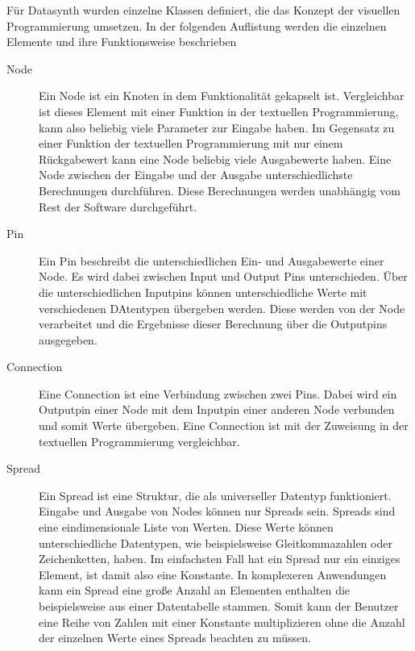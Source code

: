 \documentclass[a4paper, 12pt, DIVcalc, onepage, pdftex, headsepline, footsepline]{scrreprt}
\begin{document}
Für Datasynth wurden einzelne Klassen definiert, die das Konzept der visuellen
Programmierung umsetzen. In der folgenden Auflistung werden die einzelnen
Elemente und ihre Funktionsweise beschrieben
\begin{description}
\item[Node]
Ein Node ist ein Knoten in dem Funktionalität gekapselt ist. Vergleichbar ist dieses
Element mit einer Funktion in der textuellen Programmierung, kann also
beliebig viele Parameter zur Eingabe haben. Im Gegensatz zu einer Funktion der textuellen
Programmierung mit nur einem Rückgabewert kann eine Node beliebig viele Ausgabewerte haben.
Eine Node zwischen der Eingabe und der Ausgabe unterschiedlichste Berechnungen durchführen.
Diese Berechnungen werden unabhängig vom Rest der Software durchgeführt.
\item[Pin]
Ein Pin beschreibt die unterschiedlichen Ein- und Ausgabewerte einer Node.
Es wird dabei zwischen Input und Output Pins unterschieden. Über die unterschiedlichen
Inputpins können unterschiedliche Werte mit verschiedenen DAtentypen übergeben werden.
Diese werden von der Node verarbeitet und die Ergebnisse dieser Berechnung
über die Outputpins ausgegeben.
\item[Connection]
Eine Connection ist eine Verbindung zwischen zwei Pins. Dabei wird ein Outputpin einer
Node mit dem Inputpin einer anderen Node verbunden und somit Werte übergeben. Eine Connection
ist mit der Zuweisung in der textuellen Programmierung vergleichbar.
\item[Spread]
Ein Spread ist eine Struktur, die als universeller Datentyp funktioniert.
Eingabe und Ausgabe von Nodes können nur Spreads sein. Spreads sind eine 
eindimensionale Liste von Werten. Diese Werte können unterschiedliche Datentypen,
wie beispielsweise Gleitkommazahlen oder Zeichenketten, haben. Im einfachsten Fall hat
ein Spread nur ein einziges Element, ist damit also eine Konstante. In komplexeren
Anwendungen kann ein Spread eine große Anzahl an Elementen enthalten die beispielsweise
aus einer Datentabelle stammen. Somit kann der Benutzer eine Reihe von Zahlen mit
einer Konstante multiplizieren ohne die Anzahl der einzelnen Werte eines Spreads
beachten zu müssen.
\end{description}
\end{document}
